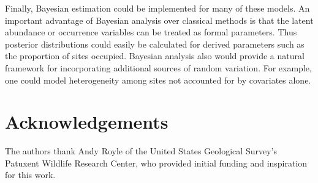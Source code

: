 \documentclass[article,shortnames]{jss}
\begin{document}
Finally, Bayesian estimation could be implemented for many of these models.  An 
important advantage of Bayesian analysis over classical methods is that the 
latent abundance or occurrence variables can be treated as formal parameters.  
Thus posterior distributions could easily be calculated for derived parameters 
such as the proportion of sites occupied.  Bayesian analysis also would provide 
a natural framework for incorporating additional sources of random variation.  
For example, one could model heterogeneity among sites not accounted for by 
covariates alone.  

\section*{Acknowledgements}

The authors thank Andy Royle of the United States Geological Survey's
Patuxent Wildlife Research Center, who provided initial funding and
inspiration for this work.


\end{document}
